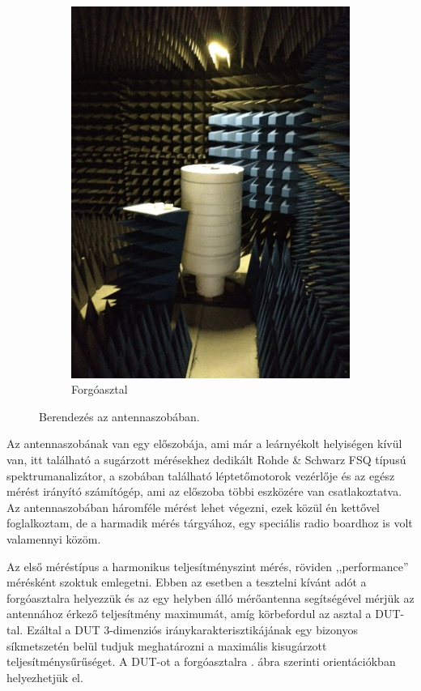 \begin{figure}
\begin{subfigure}{0.4\textwidth}
                    \includegraphics[width=\textwidth]{kep/szerkesztett/antennaszoba-asztal.jpg}
                    \caption{Forgóasztal}
                \end{subfigure}
                \caption{Berendezés az antennaszobában.}
                \label{fig:antennaszoba}
            \end{figure}
            \par
            Az antennaszobának van egy előszobája, ami már a leárnyékolt helyiségen kívül van, itt található a sugárzott mérésekhez dedikált Rohde \& Schwarz FSQ típusú spektrumanalizátor, a szobában található léptetőmotorok vezérlője és az egész mérést irányító számítógép, ami az előszoba többi eszközére van csatlakoztatva. Az antennaszobában háromféle mérést lehet végezni, ezek közül én kettővel foglalkoztam, de a harmadik mérés tárgyához, egy speciális radio boardhoz is volt valamennyi közöm.
            \par
            Az első méréstípus a harmonikus teljesítményszint mérés, röviden ,,performance'' mérésként szoktuk emlegetni. Ebben az esetben a tesztelni kívánt adót a forgóasztalra helyezzük és az egy helyben álló mérőantenna segítségével mérjük az antennához érkező teljesítmény maximumát, amíg körbefordul az asztal a DUT-tal. Ezáltal a DUT 3-dimenziós iránykarakterisztikájának egy bizonyos síkmetszetén belül tudjuk meghatározni a maximális kisugárzott teljesítménysűrűséget. A DUT-ot a forgóasztalra . ábra szerinti orientációkban helyezhetjük el.
